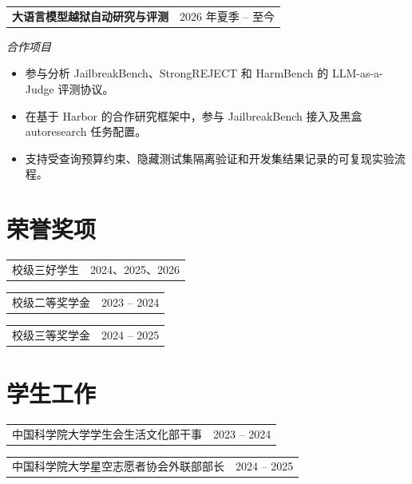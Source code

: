 \documentclass[11pt,a4paper]{ctexart}
\makeatletter
\newcommand{\sectionicon}[1]{\raisebox{-0.08em}{\small #1}\hspace{0.45em}}
\newcommand{\research}[3]{%
  \begin{tabularx}{\textwidth}{@{}Xr@{}}
    {\bfseries #1} & {\small\color{textgray}#2}
  \end{tabularx}%
}
\newcommand{\dateditem}[2]{%
  \begin{tabularx}{\textwidth}{@{}Xr@{}}
    {#1} & {\small\color{textgray}#2}\\[-0.12em]
  \end{tabularx}\vspace{0.34em}%
}
\makeatother
\begin{document}
\vspace{0.5em}
\research{大语言模型越狱自动研究与评测}{2026 年夏季 -- 至今}{}
{\small\itshape\color{textgray}合作项目}\par
\begin{itemize}
  \item 参与分析 JailbreakBench、StrongREJECT 和 HarmBench 的 LLM-as-a-Judge 评测协议。
  \item 在基于 Harbor 的合作研究框架中，参与 JailbreakBench 接入及黑盒 autoresearch 任务配置。
  \item 支持受查询预算约束、隐藏测试集隔离验证和开发集结果记录的可复现实验流程。
\end{itemize}

\section[荣誉奖项]{\sectionicon{\faAward}荣誉奖项}
\dateditem{校级三好学生}{2024、2025、2026}
\dateditem{校级二等奖学金}{2023 -- 2024}
\dateditem{校级三等奖学金}{2024 -- 2025}

\section[学生工作]{\sectionicon{\faUsers}学生工作}
\dateditem{中国科学院大学学生会生活文化部干事}{2023 -- 2024}
\dateditem{中国科学院大学星空志愿者协会外联部部长}{2024 -- 2025}
\end{document}
